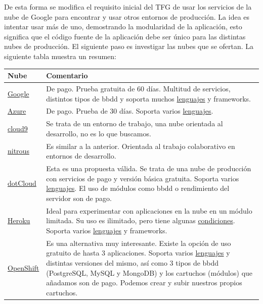 De esta forma se modifica el requisito inicial del TFG de usar los servicios de la nube de Google para encontrar y usar otros entornos de producción. La idea es intentar usar más de uno, demostrando la modularidad de la aplicación, esto significa que el código fuente de la aplicación debe ser único para las distintas nubes de producción. El siguiente paso es investigar las nubes que se ofertan. La siguiente tabla muestra un resumen:

\begin{table}
	\centering
	\begin{tabular}{p{3cm} p{8cm}}
	\hline
	\textbf{Nube} & \textbf{Comentario} \\
	\hline \hline
	\href{https://cloud.google.com/free-trial/?hl=es&_ga=1.261030148.846668794.1427305506}{Google} & De pago. Prueba gratuita de 60 días. Multitud de servicios, distintos tipos de bbdd y soporta muchos \href{https://cloud.google.com/launcher/?hl=es}{lenguajes} y frameworks. \\
	\hline
	\href{http://azure.microsoft.com/en-us/}{Azure} & De pago. Prueba de 30 días. Soporta varios \href{https://tryappservice.azure.com/}{lenguajes}. \\
	\hline
	\href{https://c9.io/}{cloud9} & Se trata de un entorno de trabajo, una nube orientada al desarrollo, no es lo que buscamos. \\
	\hline
	\href{https://www.nitrous.io/}{nitrous} & Es similar a la anterior. Orientada al trabajo colaborativo en entornos de desarrollo. \\
	\hline
	\href{https://www.dotcloud.com/}{dotCloud} & Esta es una propuesta válida. Se trata de una nube de producción con servicios de pago y versión básica gratuita. Soporta varios \href{https://www.dotcloud.com/dev-center/guides}{lenguajes}. El uso de módulos como bbdd o rendimiento del servidor son de pago. \\
	\hline
	\href{https://www.heroku.com/}{Heroku} & Ideal para experimentar con aplicaciones en la nube en un módulo limitada. Su uso es ilimitado, pero tiene algunas \href{https://www.heroku.com/pricing}{condiciones}. Soporta varios \href{https://devcenter.heroku.com/categories/language-support}{lenguajes} y frameworks. \\
	\hline
	\href{https://www.openshift.com/}{OpenShift} & Es una alternativa muy interesante. Existe la opción de uso gratuito de hasta 3 aplicaciones. Soporta varios \href{https://www.openshift.com/promotions/try-openshift?sc_cid=70160000000UJArAAO&gclid=CMqo54DUy8cCFSMcwwodxLoGGQ}{lenguajes} y distintas versiones del mismo, así como 3 tipos de bbdd (PostgreSQL, MySQL y MongoDB) y los cartuchos (módulos) que añadamos son de pago. Podemos crear y subir nuestros propios cartuchos. \\

\end{tabular}
\end{table}
